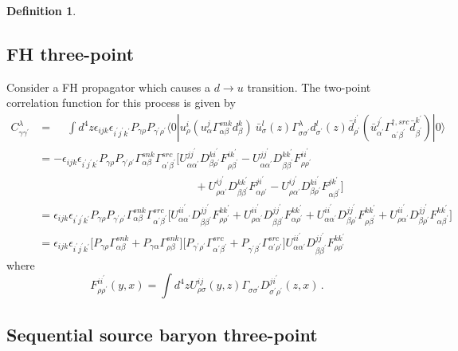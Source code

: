 \documentclass[prd,12pt,superscriptaddress,tightenlines,nofootinbib]{revtex4}
\def\a{{\alpha}}
\def\b{{\beta}}
\def\g{{\gamma}}
\def\G{{\Gamma}}
\def\l{{\lambda}}
\def\s{{\sigma}}
\def\ip{{i^\prime}}
\def\jp{{j^\prime}}
\def\kp{{k^\prime}}
\def\ap{{\alpha^\prime}}
\def\bp{{\beta^\prime}}
\def\gp{{\gamma^\prime}}
\def\rp{{\rho^\prime}}
\def\sp{{\sigma^\prime}}
\theoremstyle{plain}
\theoremstyle{definition}
\newtheorem{defn}[thm]{Definition}
\theoremstyle{remark}
\begin{document}
\begin{defn}
\subsection{FH three-point}
\bigskip
Consider a FH propagator which causes a $d\rightarrow u$ transition.
The two-point correlation function for this process is given by
\begin{align}
C^\l_{\g\gp} &= \phantom{-}\int d^4 z \epsilon_{ijk} \epsilon_{\ip\jp\kp} P_{\g\rho} P_{\gp\rp} 
	\langle 0| 
		u^i_\rho (u^j_\a \G^{snk}_{\a\b} d^k_\b ) \ 
		\bar{u}^l_\s(z) \G^\l_{\s\sp} d^l_{\sp}(z)
		\bar{d}^\ip_\rp (\bar{u}^{\jp}_{\ap} \G^{\dagger,src}_{\ap\bp} \bar{d}^\kp_\bp ) 
	|0\rangle
\nonumber\\&=
	-\epsilon_{ijk} \epsilon_{\ip\jp\kp} P_{\g\rho} P_{\gp\rp} 
	\G^{snk}_{\a\b} \G^{src}_{\ap\bp} 
	\Big[
		U^{j\jp}_{\a\ap} D^{k\ip}_{\b\rp} F^{i\kp}_{\rho\bp}
		-U^{j\jp}_{\a\ap} D^{k\kp}_{\b\bp} F^{i\ip}_{\rho\rp}
\nonumber\\&\qquad\qquad\qquad\qquad\qquad\qquad\qquad
		+U^{i\jp}_{\rho\ap} D^{k\kp}_{\b\bp} F^{j\ip}_{\a\rp}
		-U^{i\jp}_{\rho\ap} D^{k\ip}_{\b\rp} F^{j\kp}_{\a\bp}
	\Big]
\nonumber\\&=
	\epsilon_{ijk} \epsilon_{\ip\jp\kp} P_{\g\rho} P_{\gp\rp} 
	\G^{snk}_{\a\b} \G^{src}_{\ap\bp} 
	\Big[
		U^{i\ip}_{\a\ap} D^{j\jp}_{\b\bp} F^{k\kp}_{\rho\rp}
		+U^{i\ip}_{\rho\ap} D^{j\jp}_{\b\bp} F^{k\kp}_{\a\rp}
		+U^{i\ip}_{\a\ap} D^{j\jp}_{\b\rp} F^{k\kp}_{\rho\bp}
		+U^{i\ip}_{\rho\ap} D^{j\jp}_{\b\rp} F^{k\kp}_{\a\bp}
	\Big]
\nonumber\\&=
	\epsilon_{ijk} \epsilon_{\ip\jp\kp}  
	\Big[ 
		P_{\g\rho} \G^{snk}_{\a\b} 
		+P_{\g\a} \G^{snk}_{\rho\b}
	\Big] \Big[
		P_{\gp\rp} \G^{src}_{\ap\bp} + P_{\gp\bp} \G^{src}_{\ap\rp}
	\Big]
	U^{i\ip}_{\a\ap} D^{j\jp}_{\b\bp} F^{k\kp}_{\rho\rp}
\end{align}
where
\begin{equation}
F^{i\ip}_{\rho\rp}(y,x) = \int d^4z U^{ij}_{\rho\s}(y,z)\G_{\s\sp} D^{j\ip}_{\sp\rp}(z,x)\, .
\end{equation}

\subsection{Sequential source baryon three-point}


\end{defn}
\end{document}
